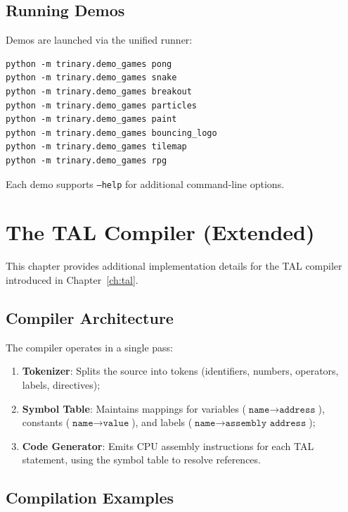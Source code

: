 \documentclass[10pt,a4paper,twoside]{book}
\begin{document}
\section{Running Demos}

Demos are launched via the unified runner:
\begin{verbatim}
python -m trinary.demo_games pong
python -m trinary.demo_games snake
python -m trinary.demo_games breakout
python -m trinary.demo_games particles
python -m trinary.demo_games paint
python -m trinary.demo_games bouncing_logo
python -m trinary.demo_games tilemap
python -m trinary.demo_games rpg
\end{verbatim}

Each demo supports \texttt{--help} for additional command-line options.

\chapter{The TAL Compiler (Extended)}
\label{ch:tal-ext}

This chapter provides additional implementation details for the TAL compiler introduced
in Chapter~\ref{ch:tal}.

\section{Compiler Architecture}

The compiler operates in a single pass:
\begin{enumerate}
    \item \textbf{Tokenizer}: Splits the source into tokens (identifiers, numbers,
          operators, labels, directives);
    \item \textbf{Symbol Table}: Maintains mappings for variables ($\texttt{name}
          \rightarrow \texttt{address}$), constants ($\texttt{name} \rightarrow
          \texttt{value}$), and labels ($\texttt{name} \rightarrow \texttt{assembly
          address}$);
    \item \textbf{Code Generator}: Emits CPU assembly instructions for each TAL
          statement, using the symbol table to resolve references.
\end{enumerate}

\section{Compilation Examples}
\end{document}
